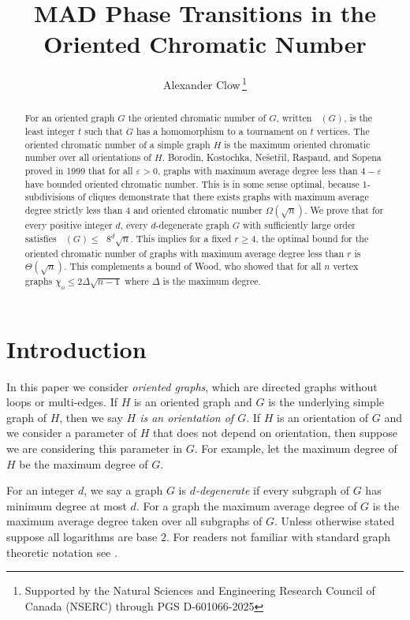 \documentclass[11pt]{article}
\title{MAD Phase Transitions in the Oriented Chromatic Number}
\author[1]{Alexander Clow\,\thanks{Supported by the Natural Sciences and Engineering Research Council of Canada (NSERC) through PGS D-601066-2025}}
\date{}
\theoremstyle{definition}
\def\epsilon{\varepsilon}
\DeclareMathOperator{\chio}{\chi_o}
\DeclareMathOperator{\coe}{6\Big(1+\frac{9d^2}{4}\Big)^{\frac{1}{2}}d}
\begin{document}

\maketitle
\begin{abstract}
    For an oriented graph $G$ the oriented chromatic number of $G$, written $\chio(G)$,
    is the least integer $t$ such that $G$ has a homomorphism to a tournament on $t$ vertices.
    The oriented chromatic number of a simple graph $H$ is the maximum oriented chromatic number over 
    all orientations of $H$.
    Borodin, Kostochka, Ne{\v{s}}et{\v{r}}il, Raspaud, and Sopena
    proved in 1999
    that for all $\epsilon>0$,
    graphs with maximum average degree less than $4-\epsilon$
    have bounded oriented chromatic number.
    This is in some sense optimal, because $1$-subdivisions of cliques demonstrate that there 
    exists graphs with maximum average degree strictly less than $4$
    and oriented chromatic number $\Omega(\sqrt{n})$.
    We prove that for every positive integer $d$,
    every
    $d$-degenerate graph $G$ with sufficiently large order satisfies 
    $\chio(G) \leq \coe 8^{d}\sqrt{n}$.
    This implies for a fixed $r\geq 4$, 
    the optimal bound for the oriented chromatic number
    of graphs with maximum average degree less than $r$ 
    is $\Theta(\sqrt{n})$.
    This complements a bound of Wood,
    who showed that for all $n$ vertex graphs $\chi_o \leq 2\Delta\sqrt{n-1}$
    where $\Delta$ is the maximum degree.
\end{abstract}



\section{Introduction}


In this paper we consider \emph{oriented graphs}, which are directed graphs without loops or multi-edges.
If $H$ is an oriented graph and $G$ is the underlying simple graph of $H$, then we say \emph{$H$ is an orientation of $G$}.
If $H$ is an orientation of $G$ and we consider a parameter of $H$ that does not depend on orientation, then suppose we are considering this parameter in $G$. 
For example, let the maximum degree of $H$ be the maximum degree of $G$.

For an integer $d$, we say a graph $G$ is \emph{$d$-degenerate} if every subgraph of $G$ has minimum degree at most $d$.
For a graph the maximum average degree of $G$ is the maximum average degree taken over all subgraphs of $G$.
Unless otherwise stated suppose all logarithms are base $2$.
For readers not familiar with standard graph theoretic notation see \cite{West1996}.
\end{document}

